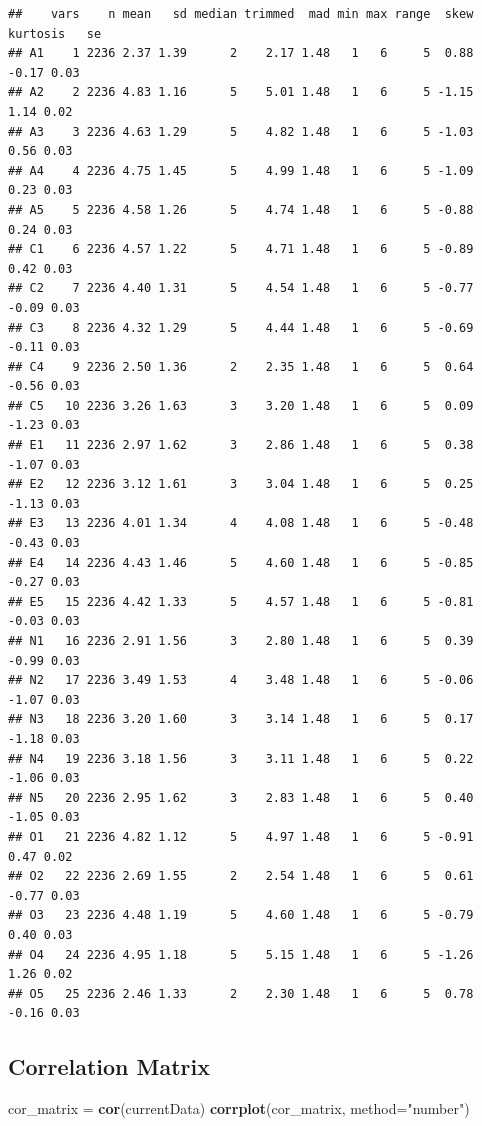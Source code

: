 \documentclass[
]{ctexart}
\newenvironment{Shaded}{\begin{snugshade}}{\end{snugshade}}
\newcommand{\AttributeTok}[1]{\textcolor[rgb]{0.13,0.29,0.53}{#1}}
\newcommand{\FunctionTok}[1]{\textcolor[rgb]{0.13,0.29,0.53}{\textbf{#1}}}
\newcommand{\NormalTok}[1]{#1}
\newcommand{\OtherTok}[1]{\textcolor[rgb]{0.56,0.35,0.01}{#1}}
\newcommand{\StringTok}[1]{\textcolor[rgb]{0.31,0.60,0.02}{#1}}
\begin{document}
\begin{verbatim}
##    vars    n mean   sd median trimmed  mad min max range  skew kurtosis   se
## A1    1 2236 2.37 1.39      2    2.17 1.48   1   6     5  0.88    -0.17 0.03
## A2    2 2236 4.83 1.16      5    5.01 1.48   1   6     5 -1.15     1.14 0.02
## A3    3 2236 4.63 1.29      5    4.82 1.48   1   6     5 -1.03     0.56 0.03
## A4    4 2236 4.75 1.45      5    4.99 1.48   1   6     5 -1.09     0.23 0.03
## A5    5 2236 4.58 1.26      5    4.74 1.48   1   6     5 -0.88     0.24 0.03
## C1    6 2236 4.57 1.22      5    4.71 1.48   1   6     5 -0.89     0.42 0.03
## C2    7 2236 4.40 1.31      5    4.54 1.48   1   6     5 -0.77    -0.09 0.03
## C3    8 2236 4.32 1.29      5    4.44 1.48   1   6     5 -0.69    -0.11 0.03
## C4    9 2236 2.50 1.36      2    2.35 1.48   1   6     5  0.64    -0.56 0.03
## C5   10 2236 3.26 1.63      3    3.20 1.48   1   6     5  0.09    -1.23 0.03
## E1   11 2236 2.97 1.62      3    2.86 1.48   1   6     5  0.38    -1.07 0.03
## E2   12 2236 3.12 1.61      3    3.04 1.48   1   6     5  0.25    -1.13 0.03
## E3   13 2236 4.01 1.34      4    4.08 1.48   1   6     5 -0.48    -0.43 0.03
## E4   14 2236 4.43 1.46      5    4.60 1.48   1   6     5 -0.85    -0.27 0.03
## E5   15 2236 4.42 1.33      5    4.57 1.48   1   6     5 -0.81    -0.03 0.03
## N1   16 2236 2.91 1.56      3    2.80 1.48   1   6     5  0.39    -0.99 0.03
## N2   17 2236 3.49 1.53      4    3.48 1.48   1   6     5 -0.06    -1.07 0.03
## N3   18 2236 3.20 1.60      3    3.14 1.48   1   6     5  0.17    -1.18 0.03
## N4   19 2236 3.18 1.56      3    3.11 1.48   1   6     5  0.22    -1.06 0.03
## N5   20 2236 2.95 1.62      3    2.83 1.48   1   6     5  0.40    -1.05 0.03
## O1   21 2236 4.82 1.12      5    4.97 1.48   1   6     5 -0.91     0.47 0.02
## O2   22 2236 2.69 1.55      2    2.54 1.48   1   6     5  0.61    -0.77 0.03
## O3   23 2236 4.48 1.19      5    4.60 1.48   1   6     5 -0.79     0.40 0.03
## O4   24 2236 4.95 1.18      5    5.15 1.48   1   6     5 -1.26     1.26 0.02
## O5   25 2236 2.46 1.33      2    2.30 1.48   1   6     5  0.78    -0.16 0.03
\end{verbatim}

\hypertarget{correlation-matrix}{%
\subsection{Correlation Matrix}\label{correlation-matrix}}

\begin{Shaded}
\begin{Highlighting}[]
\NormalTok{cor\_matrix }\OtherTok{=} \FunctionTok{cor}\NormalTok{(currentData)}
\FunctionTok{corrplot}\NormalTok{(cor\_matrix, }\AttributeTok{method=}\StringTok{"number"}\NormalTok{)}
\end{Highlighting}
\end{Shaded}
\end{document}
